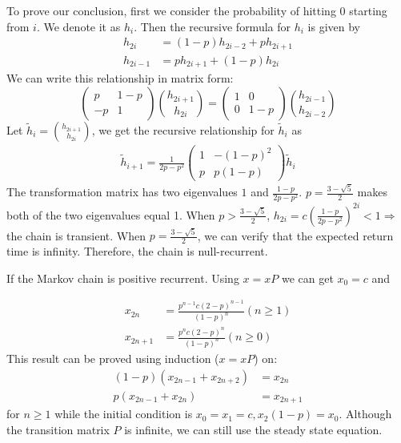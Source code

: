 \documentclass{article}
\begin{document}
\begin{enumerate}
To prove our conclusion, first we consider
the probability of hitting $0$ starting from $i$. We denote it as $h_i$. Then the recursive
formula for $h_i$ is given by
\begin{align*}
    h_{2i} &= (1-p) h_{2i-2} + p h_{2i+1} \\
    h_{2i-1} &= p h_{2i+1} + (1-p) h_{2i}
\end{align*}
We can write this relationship in matrix form:
\begin{equation*}
    \begin{pmatrix}
    p & 1-p \\
    -p & 1
    \end{pmatrix}
    \binom{h_{2i+1}}{h_{2i}}
    =    \begin{pmatrix}
    1 & 0 \\
    0 & 1-p
    \end{pmatrix}
    \binom{h_{2i-1}}{h_{2i-2}}
\end{equation*}
Let $\tilde{h}_i = \binom{h_{2i+1}}{h_{2i}}$,
we get the recursive relationship for
$\tilde{h}_i$ as
\begin{align*}
    \tilde{h}_{i+1}
    = \frac{1}{2p-p^2}\begin{pmatrix}
    1 & -(1-p)^2 \\
    p & p(1-p)
    \end{pmatrix}\tilde{h}_{i}
\end{align*}
The transformation matrix has two eigenvalues
$1$ and $\frac{1-p}{2p-p^2}$. $p=\frac{3-\sqrt{5}}{2}$ makes both of the two eigenvalues equal 1. When $p>\frac{3-\sqrt{5}}{2}$, $h_{2i}=c(\frac{1-p}{2p-p^2})^{2i} < 1 \Rightarrow$
the chain is transient. When
$p=\frac{3-\sqrt{5}}{2}$, we can verify that
the expected return time is infinity.
Therefore, the chain is null-recurrent.

If the Markov chain is positive recurrent. Using
$x = x P$ we can get $x_0 = c$ and

\begin{align*}
x_{2n} &= \frac{p^{n-1} c (2-p)^{n-1}}{(1-p)^n} (n\geq 1) \\
x_{2n+1} & = \frac{p^n c (2-p)^n}{(1-p)^n} (n\geq 0)
\end{align*}
This result can be proved using induction ($x=xP$) on:
\begin{align*}
    (1-p)(x_{2n-1} + x_{2n+2}) &= x_{2n} \\
    p(x_{2n-1} + x_{2n}) &= x_{2n+1}
\end{align*} for $n\geq 1$
while the initial condition is
$x_0=x_1=c, x_2(1-p)=x_0$.
Although the transition matrix $P$ is infinite, we can
still use the steady state equation.


\end{enumerate}
\end{document}
